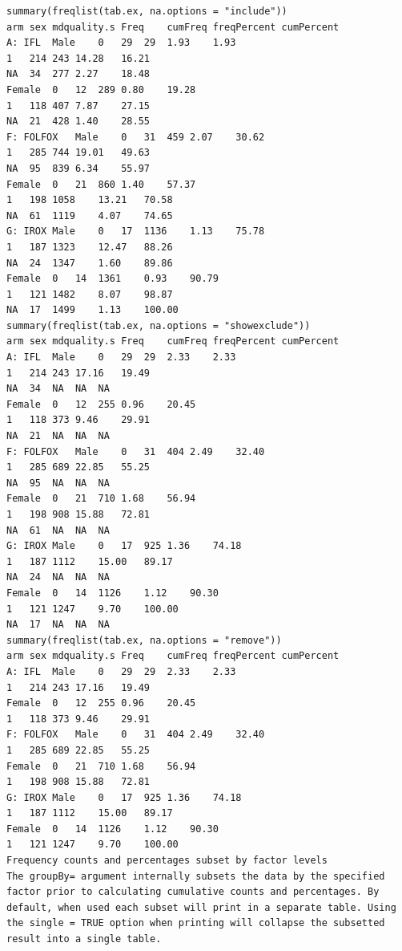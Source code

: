 \documentclass[
]{book}
\begin{document}
\begin{verbatim}
summary(freqlist(tab.ex, na.options = "include"))
arm sex mdquality.s Freq    cumFreq freqPercent cumPercent
A: IFL  Male    0   29  29  1.93    1.93
1   214 243 14.28   16.21
NA  34  277 2.27    18.48
Female  0   12  289 0.80    19.28
1   118 407 7.87    27.15
NA  21  428 1.40    28.55
F: FOLFOX   Male    0   31  459 2.07    30.62
1   285 744 19.01   49.63
NA  95  839 6.34    55.97
Female  0   21  860 1.40    57.37
1   198 1058    13.21   70.58
NA  61  1119    4.07    74.65
G: IROX Male    0   17  1136    1.13    75.78
1   187 1323    12.47   88.26
NA  24  1347    1.60    89.86
Female  0   14  1361    0.93    90.79
1   121 1482    8.07    98.87
NA  17  1499    1.13    100.00
summary(freqlist(tab.ex, na.options = "showexclude"))
arm sex mdquality.s Freq    cumFreq freqPercent cumPercent
A: IFL  Male    0   29  29  2.33    2.33
1   214 243 17.16   19.49
NA  34  NA  NA  NA
Female  0   12  255 0.96    20.45
1   118 373 9.46    29.91
NA  21  NA  NA  NA
F: FOLFOX   Male    0   31  404 2.49    32.40
1   285 689 22.85   55.25
NA  95  NA  NA  NA
Female  0   21  710 1.68    56.94
1   198 908 15.88   72.81
NA  61  NA  NA  NA
G: IROX Male    0   17  925 1.36    74.18
1   187 1112    15.00   89.17
NA  24  NA  NA  NA
Female  0   14  1126    1.12    90.30
1   121 1247    9.70    100.00
NA  17  NA  NA  NA
summary(freqlist(tab.ex, na.options = "remove"))
arm sex mdquality.s Freq    cumFreq freqPercent cumPercent
A: IFL  Male    0   29  29  2.33    2.33
1   214 243 17.16   19.49
Female  0   12  255 0.96    20.45
1   118 373 9.46    29.91
F: FOLFOX   Male    0   31  404 2.49    32.40
1   285 689 22.85   55.25
Female  0   21  710 1.68    56.94
1   198 908 15.88   72.81
G: IROX Male    0   17  925 1.36    74.18
1   187 1112    15.00   89.17
Female  0   14  1126    1.12    90.30
1   121 1247    9.70    100.00
Frequency counts and percentages subset by factor levels
The groupBy= argument internally subsets the data by the specified factor prior to calculating cumulative counts and percentages. By default, when used each subset will print in a separate table. Using the single = TRUE option when printing will collapse the subsetted result into a single table.


\end{verbatim}
\end{document}
